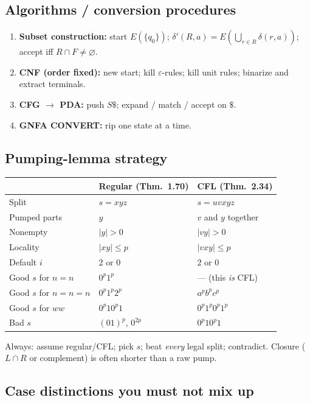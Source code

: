 \documentclass[11pt,a4paper]{article}
\newcommand{\eps}{\varepsilon}
\begin{document}
\subsection{Algorithms / conversion procedures}

\begin{enumerate}[leftmargin=1.2em]
  \item \textbf{Subset construction:} start $E(\{q_0\})$;
        $\delta'(R,a)=E(\bigcup_{r\in R}\delta(r,a))$; accept iff
        $R\cap F\neq\varnothing$.
  \item \textbf{CNF (order fixed):} new start; kill $\eps$-rules;
        kill unit rules; binarize and extract terminals.
  \item \textbf{CFG $\to$ PDA:} push $S\$$; expand / match /
        accept on $\$$.
  \item \textbf{GNFA CONVERT:} rip one state at a time.
\end{enumerate}

\subsection{Pumping-lemma strategy}

\begin{tabular}{@{}lll@{}}
\toprule
 & Regular (Thm.~1.70) & CFL (Thm.~2.34) \\
\midrule
Split & $s=xyz$ & $s=uvxyz$ \\
Pumped parts & $y$ & $v$ and $y$ together \\
Nonempty & $|y|>0$ & $|vy|>0$ \\
Locality & $|xy|\le p$ & $|vxy|\le p$ \\
Default $i$ & $2$ or $0$ & $2$ or $0$ \\
Good $s$ for $n{=}n$ & $0^p1^p$ & --- (this \emph{is} CFL) \\
Good $s$ for $n{=}n{=}n$ & $0^p1^p2^p$ & $a^pb^pc^p$ \\
Good $s$ for $ww$ & $0^p10^p1$ & $0^p1^p0^p1^p$ \\
Bad $s$ & $(01)^p$, $0^{2p}$ & $0^p10^p1$ \\
\bottomrule
\end{tabular}

Always: assume regular/CFL; pick $s$; beat \emph{every} legal
split; contradict. Closure ($L\cap R$ or complement) is often
shorter than a raw pump.

\subsection{Case distinctions you must not mix up}
\end{document}
